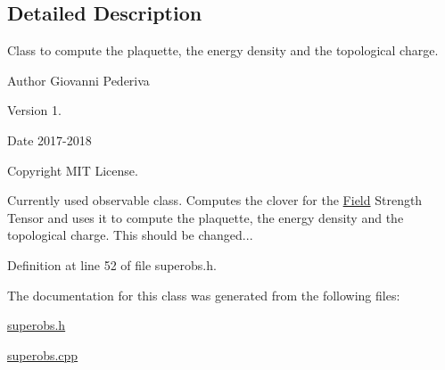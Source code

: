 \subsection{Detailed Description}
Class to compute the plaquette, the energy density and the topological charge. 

\begin{DoxyAuthor}{Author}
Giovanni Pederiva 
\end{DoxyAuthor}
\begin{DoxyVersion}{Version}
1. 
\end{DoxyVersion}
\begin{DoxyDate}{Date}
2017-\/2018 
\end{DoxyDate}
\begin{DoxyCopyright}{Copyright}
M\+IT License.
\end{DoxyCopyright}
Currently used observable class. Computes the clover for the \hyperlink{classField}{Field} Strength Tensor and uses it to compute the plaquette, the energy density and the topological charge. This should be changed... 

Definition at line 52 of file superobs.\+h.



The documentation for this class was generated from the following files\+:\begin{DoxyCompactItemize}
\item 
\hyperlink{superobs_8h}{superobs.\+h}\item 
\hyperlink{superobs_8cpp}{superobs.\+cpp}\end{DoxyCompactItemize}
